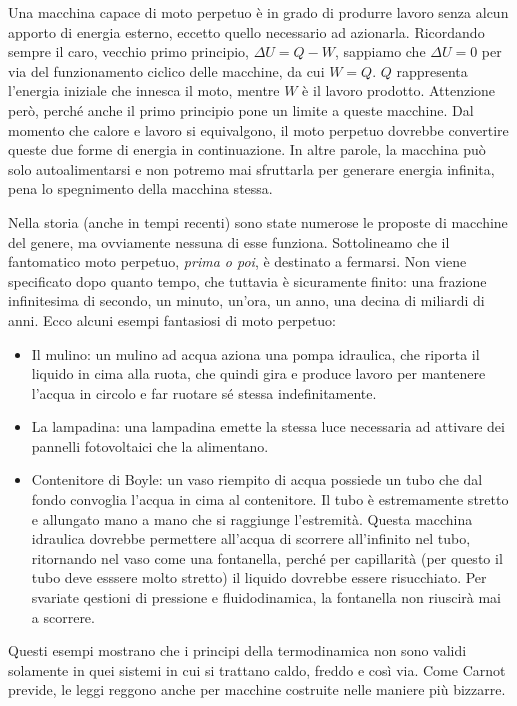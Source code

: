 Una macchina capace di moto
perpetuo è in grado di produrre lavoro senza alcun apporto di energia esterno,
eccetto quello necessario ad azionarla. Ricordando sempre il caro, vecchio primo
principio, $\Delta U = Q - W$, sappiamo che $\Delta U = 0$ per via del
funzionamento ciclico delle macchine, da cui $W = Q$. $Q$ rappresenta l'energia
iniziale che innesca il moto, mentre $W$ è il lavoro prodotto. Attenzione però,
perché anche il primo principio pone un limite a queste macchine.
Dal momento che calore e lavoro si equivalgono, il moto perpetuo dovrebbe
convertire queste due forme di energia in continuazione. In altre parole,
la macchina può solo autoalimentarsi e non potremo mai sfruttarla per generare
energia infinita, pena lo spegnimento della macchina stessa.

Nella storia (anche in tempi recenti) sono state numerose le proposte
di macchine del genere, ma ovviamente nessuna di esse funziona.
Sottolineamo che il fantomatico moto perpetuo, \emph{prima o poi}, è
destinato a fermarsi. Non viene specificato dopo quanto tempo, che tuttavia
è sicuramente finito: una frazione infinitesima di secondo, un minuto,
un'ora, un anno, una decina di miliardi di anni.
Ecco alcuni esempi fantasiosi di moto perpetuo:

\begin{itemize}
    \item Il mulino: un mulino ad acqua aziona una pompa idraulica,
    che riporta il liquido in cima alla ruota, che quindi gira e
    produce lavoro per mantenere l'acqua in circolo e far ruotare
    sé stessa indefinitamente.

    \item La lampadina: una lampadina emette la stessa luce necessaria
    ad attivare dei pannelli fotovoltaici che la alimentano.

    \item Contenitore di Boyle: un vaso riempito di acqua possiede
    un tubo che dal fondo convoglia l'acqua in cima al contenitore.
    Il tubo è estremamente stretto e allungato mano a mano che si
    raggiunge l'estremità. Questa macchina idraulica dovrebbe permettere
    all'acqua di scorrere all'infinito nel tubo, ritornando nel
    vaso come una fontanella, perché per capillarità (per questo il tubo deve esssere molto
    stretto) il liquido dovrebbe essere risucchiato. Per svariate
    qestioni di pressione e fluidodinamica, la fontanella non
    riuscirà mai a scorrere.
\end{itemize}

Questi esempi mostrano che i principi della termodinamica non
sono validi solamente in quei sistemi in cui si trattano caldo,
freddo e così via. Come Carnot previde, le leggi reggono anche
per macchine costruite nelle maniere più bizzarre.